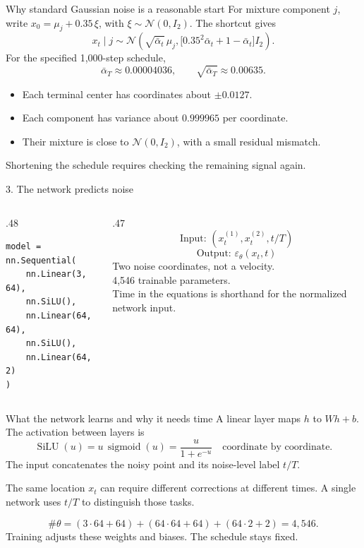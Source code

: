 \documentclass[aspectratio=169,11pt]{beamer}
\begin{document}
\begin{frame}{Why standard Gaussian noise is a reasonable start}
For mixture component $j$, write $x_0=\mu_j+0.35\,\xi$, with $\xi\sim\mathcal N(0,I_2)$. The shortcut gives
\[x_t\mid j\sim\mathcal N\!\left(\sqrt{\bar\alpha_t}\,\mu_j,
\bigl[0.35^2\bar\alpha_t+1-\bar\alpha_t\bigr]I_2\right).\]
For the specified 1,000-step schedule,
\[\bar\alpha_T\approx0.00004036,\qquad\sqrt{\bar\alpha_T}\approx0.00635.\]
\begin{itemize}\setlength\itemsep{2mm}
\item Each terminal center has coordinates about $\pm0.0127$.
\item Each component has variance about $0.999965$ per coordinate.
\item Their mixture is close to $\mathcal N(0,I_2)$, with a small residual mismatch.
\end{itemize}
\par\vspace{2mm}
Shortening the schedule requires checking the remaining signal again.
\end{frame}

\begin{frame}[fragile]{3. The network predicts noise}
\begin{columns}[c]
\begin{column}{.48\textwidth}
\begin{lstlisting}
model = nn.Sequential(
    nn.Linear(3, 64),
    nn.SiLU(),
    nn.Linear(64, 64),
    nn.SiLU(),
    nn.Linear(64, 2)
)
\end{lstlisting}
\end{column}
\begin{column}{.47\textwidth}
\[\text{Input: }(x_t^{(1)},x_t^{(2)},t/T)\]
\[\text{Output: }\varepsilon_\theta(x_t,t)\]
\small
Two noise coordinates, not a velocity.\\[4mm]
4,546 trainable parameters.\\[4mm]
Time in the equations is shorthand for the normalized network input.
\end{column}
\end{columns}
\end{frame}

\begin{frame}{What the network learns and why it needs time}
A linear layer maps $h$ to $Wh+b$. The activation between layers is
\[\operatorname{SiLU}(u)=u\,\operatorname{sigmoid}(u)
=\frac{u}{1+e^{-u}}\quad\text{coordinate by coordinate}.\]
The input concatenates the noisy point and its noise-level label $t/T$.
\par\vspace{3mm}
The same location $x_t$ can require different corrections at different times. A single network uses $t/T$ to distinguish those tasks.
\par\vspace{3mm}
\[\#\theta=(3\cdot64+64)+(64\cdot64+64)+(64\cdot2+2)=4{,}546.\]
Training adjusts these weights and biases. The schedule stays fixed.
\end{frame}
\end{document}
